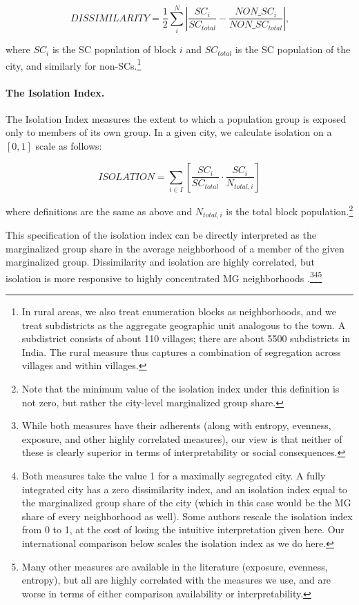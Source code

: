 \documentclass[12pt]{article}
\begin{document}
\begin{equation}
  \nonumber
  DISSIMILARITY=\frac{1}{2}
  \sum_i^N\left|\frac{SC_i}{SC_{total}}-\frac{NON\_SC_i}{NON\_SC_{total}}\right|\text{,}
\end{equation}

\noindent where $SC_i$ is the SC population of block $i$ and $SC_{total}$ is the SC population of the city, and similarly for non-SCs.\footnote{In rural areas, we also treat enumeration blocks as neighborhoods, and we treat subdistricts as the aggregate geographic unit analogous to the town. A subdistrict consists of about 110 villages; there are about 5500 subdistricts in India. The rural measure thus captures a combination of segregation across villages and within villages.} 

\paragraph{The Isolation Index.} The Isolation Index \citep{bell1954} measures the extent to which a population group is exposed only to members of its own group. In a given city, we calculate isolation on a $[0,1]$ scale as follows:

\begin{equation}
  \nonumber
  ISOLATION=\sum_{i \in I}\left[\frac{SC_i}{SC_{total}} \cdot \frac{SC_i}{N_{total,i}}\right]
\end{equation}

\noindent where definitions are the same as above and $N_{total,i}$ is the total block population.\footnote{Note that the minimum value of the isolation index under this definition is not zero, but rather the city-level marginalized group share.}

This specification of the isolation index can be directly interpreted as the marginalized group share in the average neighborhood of a member of the given marginalized group. Dissimilarity and isolation are highly correlated, but isolation is more responsive to highly concentrated MG neighborhoods \citep{massey1988}.\footnote{While both measures have their adherents (along with entropy, evenness, exposure, and other highly correlated measures), our view is that neither of these is clearly superior in terms of interpretability or social consequences.}\footnote{Both measures take the value 1 for a maximally segregated city. A fully integrated city has a zero dissimilarity index, and an isolation index equal to the marginalized group share of the city (which in this case would be the MG share of every neighborhood as well). Some authors rescale the isolation index from 0 to 1, at the cost of losing the intuitive interpretation given here. Our international comparison below scales the isolation index as we do here.}\superscript{,}\footnote{Many other measures are available in the literature (exposure, evenness, entropy), but all are highly correlated with the measures we use, and are worse in terms of either comparison availability or interpretability.}
\end{document}
